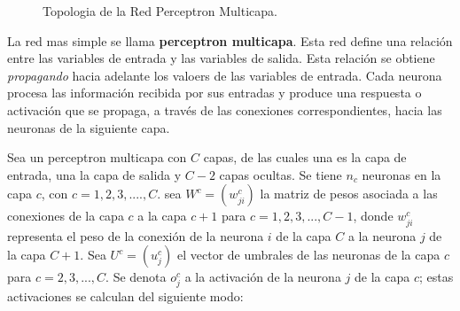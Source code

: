 \documentclass[12pt]{article}
\begin{document}
\begin{figure}[h]
\centering
\caption{Topologia de la Red Perceptron Multicapa.}
\label{fig:MLP}
\end{figure}


La red mas simple se llama \textbf{perceptron multicapa}. Esta red define una relación entre las variables de entrada y las variables de salida. Esta relación se obtiene \textit{propagando} hacia adelante los valoers de las variables de entrada. Cada neurona procesa las información recibida por sus entradas y produce una respuesta o activación que se propaga, a través de las conexiones correspondientes, hacia las neuronas de la siguiente capa.\hfill \break

Sea un perceptron multicapa con $C$ capas, de las cuales una es la capa de entrada, una la capa de salida y $C-2$ capas ocultas. Se tiene $n_c$ neuronas en la capa $c$, con $c= 1,2,3,....,C$. sea $W^c = (w_{ji}^c)$ la matriz de pesos asociada a las conexiones de la capa $c$ a la capa $c+1$ para $c=1,2,3,...,C-1$, donde $w_{ji}^c$ representa el peso de la conexión de la neurona $i$ de la capa $C$ a la neurona $j$ de la capa $C+1$. Sea $U^c = (u_j^c)$ el vector de umbrales  de las neuronas de la capa $c$ para $c=2,3,...,C$. Se denota $o_j^c$ a la activación de la neurona $j$ de la capa $c$; estas activaciones se calculan del siguiente modo:
\end{document}
